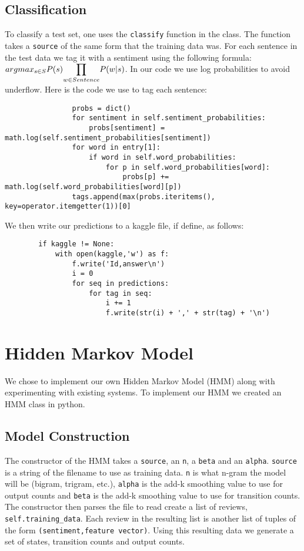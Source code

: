 \documentclass{article}
\begin{document}
\subsection{Classification}

To classify a test set, one uses the \texttt{classify} function in the class. The function takes a \texttt{source} of the same form that the training data was. For each sentence in the test data we tag it with a sentiment using the following formula: $argmax_{s\in S}P(s)\mathlarger{\prod}_{w\in Sentence} P(w|s)$. In our code we use log probabilities to avoid underflow. Here is the code we use to tag each sentence:

\begin{verbatim}
                probs = dict()
                for sentiment in self.sentiment_probabilities:
                    probs[sentiment] = math.log(self.sentiment_probabilities[sentiment])
                for word in entry[1]:
                    if word in self.word_probabilities:
                        for p in self.word_probabilities[word]:
                            probs[p] += math.log(self.word_probabilities[word][p])
                tags.append(max(probs.iteritems(), key=operator.itemgetter(1))[0]
\end{verbatim}

We then write our predictions to a kaggle file, if define, as follows:
\begin{verbatim}
        if kaggle != None:
            with open(kaggle,'w') as f:
                f.write('Id,answer\n')
                i = 0
                for seq in predictions:
                    for tag in seq:
                        i += 1
                        f.write(str(i) + ',' + str(tag) + '\n')
\end{verbatim}
\section{Hidden Markov Model}

We chose to implement our own Hidden Markov Model (HMM) along with experimenting with existing systems. To implement our HMM we created an HMM class in python.

\subsection{Model Construction}
The constructor of the HMM takes a \texttt{source}, an \texttt{n}, a \texttt{beta} and an \texttt{alpha}. \texttt{source} is a string of the filename to use as training data. \texttt{n} is what n-gram the model will be (bigram, trigram, etc.), \texttt{alpha} is the add-k smoothing value to use for output counts and \texttt{beta} is the add-k smoothing value to use for transition counts. The constructor then parses the file to read create a list of reviews, \texttt{self.training\_data}. Each review in the resulting list is another list of tuples of the form \texttt{(sentiment,feature vector)}. Using this resulting data we generate a set of states, transition counts and output counts.
\end{document}
